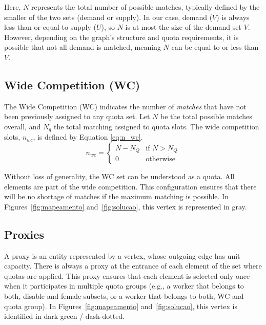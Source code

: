                 Here, \( N \) represents the total number of possible matches, typically defined by the smaller of the two sets (demand or supply). In our case, demand (\( V \)) is always less than or equal to supply (\( U \)), so \( N \) is at most the size of the demand set \( V \). However, depending on the graph's structure and quota requirements, it is possible that not all demand is matched, meaning \( N \) can be equal to or less than \( V \).
        
        
            \subsection{Wide Competition (WC)} \label{sec:wc}
            
                The Wide Competition (WC) indicates the number of \textit{matches} that have not been previously assigned to any quota set. Let $N$ be the total possible matches overall, and $N_q$ the total matching assigned to quota slots. The wide competition slots, $n_{wc}$, is defined by Equation \ref{eq:n_wc}.
                \begin{equation}
                    n_{wc} =
                    \begin{cases}
                        N - N_Q & \text{if } N > N_Q \\
                        0 & \text{otherwise}
                    \end{cases}
                    \label{eq:n_wc}
                \end{equation}
                
                Without loss of generality, the WC set can be understood as a quota. All elements are part of the wide competition. This configuration ensures that there will be no shortage of matches if the maximum matching is possible. In Figures~\ref{fig:mapeamento} and~\ref{fig:solucao}, this vertex is represented in gray.
            
            \subsection{Proxies}
            
                A proxy is an entity represented by a vertex, whose outgoing edge has unit capacity.
                There is always a proxy at the entrance of each element of the set where quotas are applied.
                This proxy ensures that each element is selected only once when it participates in multiple quota groups (e.g., a worker that belongs to both, disable and female subsets, or a worker that belongs to both, WC and quota group). In Figures~\ref{fig:mapeamento} and~\ref{fig:solucao}, this vertex is identified in dark green / dash-dotted.
            
